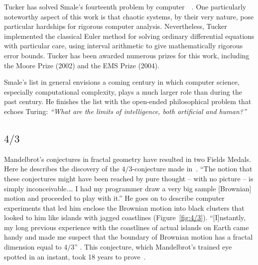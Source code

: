 \documentclass{llncs}
\begin{document}
Tucker has solved Smale's fourteenth problem by
computer~\cite{Tuc02}~\cite{St00}.  One particularly noteworthy aspect
of this work is that chaotic systems, by their very nature, pose
particular hardships for rigorous computer analysis.  Nevertheless,
Tucker implemented the classical Euler method for solving ordinary
differential equations with particular care,  using interval
arithmetic to give mathematically rigorous error bounds.  Tucker has
been awarded numerous prizes for this work, including the Moore Prize
(2002) and the EMS Prize (2004).

Smale's list in general envisions a coming century in which computer
science, especially computational complexity, plays a much larger
role than during the past century. He finishes the list with the
open-ended philosophical problem  that echoes Turing: {\it
  ``What are the limits of intelligence, both artificial and human?''}


\subsection{$4/3$}
Mandelbrot's conjectures in fractal geometry have resulted in two
Fields Medals.  Here he describes the discovery of the
$4/3$-conjecture made in~\cite{ManFN}.  
``The notion that these conjectures might have been reached by pure
  thought -- with no picture -- is simply inconceivable.\dots
I had my programmer draw a very big sample [Brownian] motion and
  proceeded to play with it.''
He goes on to describe computer experiments that led him
enclose the Brownian motion into black clusters that looked to him like islands with
jagged coastlines (Figure~\ref{fig:4/3}).
%
``[I]nstantly, my long previous experience with the coastlines of
  actual islands on Earth came handy and made me suspect that the
  boundary of Brownian motion has a fractal dimension equal to $4/3$''
\cite{Man}.
%
%
This conjecture, which  Mandelbrot's trained eye spotted in an instant,
took 18 years to prove~\cite{LSW01}.
\end{document}
